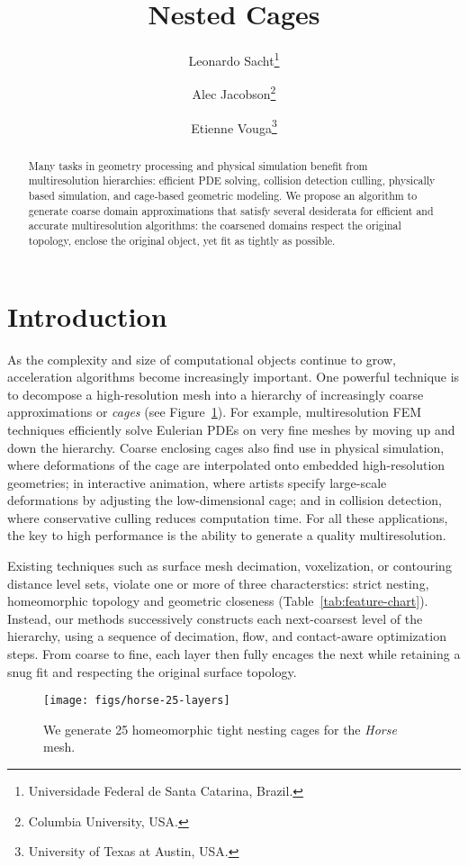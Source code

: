 \documentclass{cgyrf15}
\title{Nested Cages}
\author{
Leonardo Sacht\thanks{Universidade Federal de Santa Catarina, Brazil.} \and
Alec Jacobson\thanks{Columbia University, USA.} \and
Etienne Vouga\thanks{University of Texas at Austin, USA.} 
}
\begin{document}
\maketitle

\begin{abstract}
Many tasks in geometry processing and physical simulation benefit from
multiresolution hierarchies: efficient PDE solving, collision detection
culling, physically based simulation, and cage-based geometric modeling. We
propose an algorithm to generate coarse domain approximations that satisfy
several desiderata for efficient and accurate multiresolution algorithms: the
coarsened domains respect the original topology, enclose the original object,
yet fit as tightly as possible.
\end{abstract}

\section{Introduction}

As the complexity and size of computational objects continue to grow,
acceleration algorithms become increasingly important. One powerful technique
is to decompose a high-resolution mesh into a hierarchy of increasingly coarse
approximations or \emph{cages} (see Figure~\ref{fig:horse}). For example,
multiresolution FEM techniques efficiently solve Eulerian PDEs on very fine
meshes by moving up and down the hierarchy.  Coarse enclosing cages also find
use in physical simulation, where deformations of the cage are interpolated
onto embedded high-resolution geometries; in interactive animation, where
artists specify large-scale deformations by adjusting the low-dimensional cage;
and in collision detection, where conservative culling reduces computation
time. For all these applications, the key to high performance is the ability to
generate a quality multiresolution.

Existing techniques such as surface mesh decimation, voxelization, or
contouring distance level sets, violate one or more of three characterstics:
strict nesting, homeomorphic topology and geometric closeness
(Table~\ref{tab:feature-chart}).  Instead, our methods successively constructs
each next-coarsest level of the hierarchy, using a sequence of decimation,
flow, and contact-aware optimization steps.  From coarse to fine, each layer
then fully encages the next while retaining a snug fit and respecting the
original surface topology.

\begin{figure}[t]
  \texttt{[image: figs/horse-25-layers]}
  \caption{We generate 25 homeomorphic tight nesting cages 
  for the \emph{Horse} mesh.}
  \label{fig:horse}
\end{figure}
\end{document}
